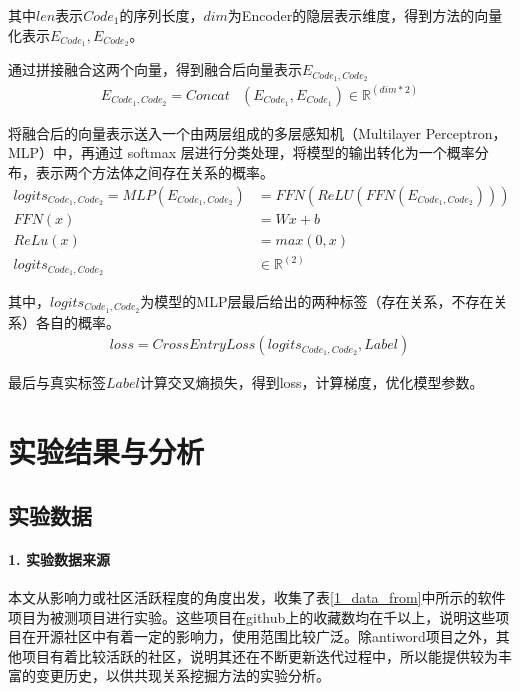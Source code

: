 其中$len$表示$Code_1$的序列长度，$dim$为Encoder的隐层表示维度，得到方法的向量化表示$ E_{Code_1}, E_{Code_2}$。

通过拼接融合这两个向量，得到融合后向量表示$E_{Code_1,Code_2}$
\begin{align}
E_{Code_1,Code_2}=Concat& (E_{Code_1},E_{Code_1})\in \mathbb{R}^{(dim*2)} 
\end{align}

将融合后的向量表示送入一个由两层组成的多层感知机（Multilayer Perceptron，MLP）中，再通过 softmax 层进行分类处理，将模型的输出转化为一个概率分布，表示两个方法体之间存在关系的概率。
\begin{align}
logits_{Code_1,Code_2}=MLP(E_{Code_1,Code_2})&=FFN(ReLU(FFN(E_{Code_1,Code_2}))) \\
FFN(x)&=Wx+b\\
ReLu(x)&=max(0,x)\\
logits_{Code_1,Code_2}& \in \mathbb{R}^{(2)}
\end{align}

其中，$logits_{Code_1,Code_2}$为模型的MLP层最后给出的两种标签（存在关系，不存在关系）各自的概率。
\begin{align}
loss=CrossEntryLoss(logits_{Code_1,Code_2}, Label)
\end{align}

最后与真实标签$Label$计算交叉熵损失，得到loss，计算梯度，优化模型参数。


\section{实验结果与分析}

\subsection{实验数据}

\paragraph{1. 实验数据来源}

本文从影响力或社区活跃程度的角度出发，收集了表\ref{1_data_from}中所示的软件项目为被测项目进行实验。这些项目在github上的收藏数均在千以上，说明这些项目在开源社区中有着一定的影响力，使用范围比较广泛。除antiword项目之外，其他项目有着比较活跃的社区，说明其还在不断更新迭代过程中，所以能提供较为丰富的变更历史，以供共现关系挖掘方法的实验分析。

